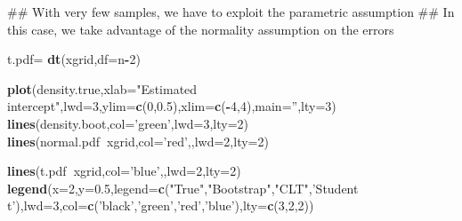 \documentclass[12pt,]{book}
\newenvironment{Shaded}{\begin{snugshade}}{\end{snugshade}}
\newcommand{\KeywordTok}[1]{\textcolor[rgb]{0.13,0.29,0.53}{\textbf{#1}}}
\newcommand{\DataTypeTok}[1]{\textcolor[rgb]{0.13,0.29,0.53}{#1}}
\newcommand{\DecValTok}[1]{\textcolor[rgb]{0.00,0.00,0.81}{#1}}
\newcommand{\FloatTok}[1]{\textcolor[rgb]{0.00,0.00,0.81}{#1}}
\newcommand{\StringTok}[1]{\textcolor[rgb]{0.31,0.60,0.02}{#1}}
\newcommand{\OperatorTok}[1]{\textcolor[rgb]{0.81,0.36,0.00}{\textbf{#1}}}
\newcommand{\NormalTok}[1]{#1}
\begin{document}
\begin{Shaded}
\begin{Highlighting}[]
\NormalTok{## With very few samples, we have to exploit the parametric assumption}
\NormalTok{## In this case, we take advantage of the normality assumption on the errors}


\NormalTok{t.pdf=}\StringTok{ }\KeywordTok{dt}\NormalTok{(xgrid,}\DataTypeTok{df=}\NormalTok{n}\OperatorTok{-}\DecValTok{2}\NormalTok{)}

\KeywordTok{plot}\NormalTok{(density.true,}\DataTypeTok{xlab=}\StringTok{"Estimated intercept"}\NormalTok{,}\DataTypeTok{lwd=}\DecValTok{3}\NormalTok{,}\DataTypeTok{ylim=}\KeywordTok{c}\NormalTok{(}\DecValTok{0}\NormalTok{,}\FloatTok{0.5}\NormalTok{),}\DataTypeTok{xlim=}\KeywordTok{c}\NormalTok{(}\OperatorTok{-}\DecValTok{4}\NormalTok{,}\DecValTok{4}\NormalTok{),}\DataTypeTok{main=}\StringTok{''}\NormalTok{,}\DataTypeTok{lty=}\DecValTok{3}\NormalTok{)}
\KeywordTok{lines}\NormalTok{(density.boot,}\DataTypeTok{col=}\StringTok{'green'}\NormalTok{,}\DataTypeTok{lwd=}\DecValTok{3}\NormalTok{,}\DataTypeTok{lty=}\DecValTok{2}\NormalTok{)}
\KeywordTok{lines}\NormalTok{(normal.pdf}\OperatorTok{~}\NormalTok{xgrid,}\DataTypeTok{col=}\StringTok{'red'}\NormalTok{,,}\DataTypeTok{lwd=}\DecValTok{2}\NormalTok{,}\DataTypeTok{lty=}\DecValTok{2}\NormalTok{)}

\KeywordTok{lines}\NormalTok{(t.pdf}\OperatorTok{~}\NormalTok{xgrid,}\DataTypeTok{col=}\StringTok{'blue'}\NormalTok{,,}\DataTypeTok{lwd=}\DecValTok{2}\NormalTok{,}\DataTypeTok{lty=}\DecValTok{2}\NormalTok{)}
\KeywordTok{legend}\NormalTok{(}\DataTypeTok{x=}\DecValTok{2}\NormalTok{,}\DataTypeTok{y=}\FloatTok{0.5}\NormalTok{,}\DataTypeTok{legend=}\KeywordTok{c}\NormalTok{(}\StringTok{"True"}\NormalTok{,}\StringTok{"Bootstrap"}\NormalTok{,}\StringTok{"CLT"}\NormalTok{,}\StringTok{'Student t'}\NormalTok{),}\DataTypeTok{lwd=}\DecValTok{3}\NormalTok{,}\DataTypeTok{col=}\KeywordTok{c}\NormalTok{(}\StringTok{'black'}\NormalTok{,}\StringTok{'green'}\NormalTok{,}\StringTok{'red'}\NormalTok{,}\StringTok{'blue'}\NormalTok{),}\DataTypeTok{lty=}\KeywordTok{c}\NormalTok{(}\DecValTok{3}\NormalTok{,}\DecValTok{2}\NormalTok{,}\DecValTok{2}\NormalTok{))}
\end{Highlighting}
\end{Shaded}
\end{document}

